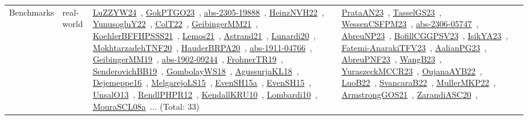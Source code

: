 {\begin{longtable}{lp{3cm}>{\raggedright\arraybackslash}p{6cm}>{\raggedright\arraybackslash}p{6cm}>{\raggedright\arraybackslash}p{8cm}}
\index{real-world}\index{Benchmarks!real-world}Benchmarks & real-world & \href{../works/LuZZYW24.pdf}{LuZZYW24}~\cite{LuZZYW24}, \href{../works/GokPTGO23.pdf}{GokPTGO23}~\cite{GokPTGO23}, \href{../works/abs-2305-19888.pdf}{abs-2305-19888}~\cite{abs-2305-19888}, \href{../works/HeinzNVH22.pdf}{HeinzNVH22}~\cite{HeinzNVH22}, \href{../works/YunusogluY22.pdf}{YunusogluY22}~\cite{YunusogluY22}, \href{../works/ColT22.pdf}{ColT22}~\cite{ColT22}, \href{../works/GeibingerMM21.pdf}{GeibingerMM21}~\cite{GeibingerMM21}, \href{../works/KoehlerBFFHPSSS21.pdf}{KoehlerBFFHPSSS21}~\cite{KoehlerBFFHPSSS21}, \href{../works/Lemos21.pdf}{Lemos21}~\cite{Lemos21}, \href{../works/Astrand21.pdf}{Astrand21}~\cite{Astrand21}, \href{../works/Lunardi20.pdf}{Lunardi20}~\cite{Lunardi20}, \href{../works/MokhtarzadehTNF20.pdf}{MokhtarzadehTNF20}~\cite{MokhtarzadehTNF20}, \href{../works/HauderBRPA20.pdf}{HauderBRPA20}~\cite{HauderBRPA20}, \href{../works/abs-1911-04766.pdf}{abs-1911-04766}~\cite{abs-1911-04766}, \href{../works/GeibingerMM19.pdf}{GeibingerMM19}~\cite{GeibingerMM19}, \href{../works/abs-1902-09244.pdf}{abs-1902-09244}~\cite{abs-1902-09244}, \href{../works/FrohnerTR19.pdf}{FrohnerTR19}~\cite{FrohnerTR19}, \href{../works/SenderovichBB19.pdf}{SenderovichBB19}~\cite{SenderovichBB19}, \href{../works/GombolayWS18.pdf}{GombolayWS18}~\cite{GombolayWS18}, \href{../works/AgussurjaKL18.pdf}{AgussurjaKL18}~\cite{AgussurjaKL18}, \href{../works/Dejemeppe16.pdf}{Dejemeppe16}~\cite{Dejemeppe16}, \href{../works/MelgarejoLS15.pdf}{MelgarejoLS15}~\cite{MelgarejoLS15}, \href{../works/EvenSH15a.pdf}{EvenSH15a}~\cite{EvenSH15a}, \href{../works/EvenSH15.pdf}{EvenSH15}~\cite{EvenSH15}, \href{../works/UnsalO13.pdf}{UnsalO13}~\cite{UnsalO13}, \href{../works/RendlPHPR12.pdf}{RendlPHPR12}~\cite{RendlPHPR12}, \href{../works/KendallKRU10.pdf}{KendallKRU10}~\cite{KendallKRU10}, \href{../works/Lombardi10.pdf}{Lombardi10}~\cite{Lombardi10}, \href{../works/MouraSCL08a.pdf}{MouraSCL08a}~\cite{MouraSCL08a}... (Total: 33) & \href{../works/PrataAN23.pdf}{PrataAN23}~\cite{PrataAN23}, \href{../works/TasselGS23.pdf}{TasselGS23}~\cite{TasselGS23}, \href{../works/WessenCSFPM23.pdf}{WessenCSFPM23}~\cite{WessenCSFPM23}, \href{../works/abs-2306-05747.pdf}{abs-2306-05747}~\cite{abs-2306-05747}, \href{../works/AbreuNP23.pdf}{AbreuNP23}~\cite{AbreuNP23}, \href{../works/BofillCGGPSV23.pdf}{BofillCGGPSV23}~\cite{BofillCGGPSV23}, \href{../works/IsikYA23.pdf}{IsikYA23}~\cite{IsikYA23}, \href{../works/Fatemi-AnarakiTFV23.pdf}{Fatemi-AnarakiTFV23}~\cite{Fatemi-AnarakiTFV23}, \href{../works/AalianPG23.pdf}{AalianPG23}~\cite{AalianPG23}, \href{../works/AbreuPNF23.pdf}{AbreuPNF23}~\cite{AbreuPNF23}, \href{../works/WangB23.pdf}{WangB23}~\cite{WangB23}, \href{../works/YuraszeckMCCR23.pdf}{YuraszeckMCCR23}~\cite{YuraszeckMCCR23}, \href{../works/OujanaAYB22.pdf}{OujanaAYB22}~\cite{OujanaAYB22}, \href{../works/LuoB22.pdf}{LuoB22}~\cite{LuoB22}, \href{../works/SvancaraB22.pdf}{SvancaraB22}~\cite{SvancaraB22}, \href{../works/MullerMKP22.pdf}{MullerMKP22}~\cite{MullerMKP22}, \href{../works/ArmstrongGOS21.pdf}{ArmstrongGOS21}~\cite{ArmstrongGOS21}, \href{../works/ZarandiASC20.pdf}{ZarandiASC20}~\cite{ZarandiASC20}, 
\end{longtable}}
